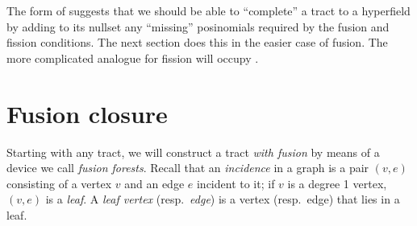 \documentclass[reqno]{amsart}
\theoremstyle{definition}
\theoremstyle{remark}
\begin{document}
    The form of   suggests 
    that we should be able to ``complete'' a tract to a hyperfield by adding to its nullset any ``missing'' posinomials required by the fusion and fission conditions. The next section does this in the easier case of fusion. The more complicated analogue for fission will occupy .

    \section{Fusion closure}\label{sec:fusion_closure}
    Starting with any tract, we will construct a tract \emph{with fusion} by means of a device we call
    \emph{fusion forests}.
    Recall that an \emph{incidence} in a graph is a pair $(v, e)$ consisting of a vertex $v$ and an edge $e$ incident to it; if $v$ is a degree 1 vertex, $(v, e)$ is a \emph{leaf}.
    A \emph{leaf vertex} (resp.\ \emph{edge}) is a vertex (resp.\ edge) that lies in a leaf.
    
\end{document}
